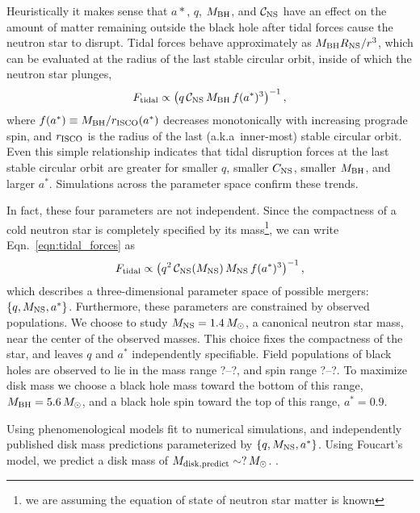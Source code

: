 Heuristically it makes sense that $a*$, $q$, $M_{\rm BH}$, and
$\mathcal{C}_{\rm NS}$ have an effect on the amount of matter remaining outside
the black hole after tidal forces cause the neutron star to disrupt.
Tidal forces behave approximately as $M_{\rm BH} R_{\rm NS}/r^3$,
which can be evaluated at the radius of the last stable circular orbit,
inside of which the neutron star plunges, 
\begin{equation}
  \label{eqn:tidal_forces}
  F_{\rm tidal} \propto
  \left(q \,\mathcal{C}_{\rm NS}\, M_{\rm BH} \,f(a^*)^3\right)^{-1},
\end{equation}
where $f(a^*) \equiv M_{\rm BH}/r_{\rm ISCO}(a^*)$ decreases monotonically with increasing
prograde spin, and $r_{\rm ISCO}$ is the radius of the last (a.k.a\ inner-most)
stable circular orbit. Even this simple relationship indicates that
tidal disruption forces at the last stable circular orbit are greater for smaller
$q$, smaller $C_{\rm NS}$, smaller $M_{\rm BH}$, and larger $a^*$.
Simulations across the parameter space confirm these trends.

In fact, these four parameters are not independent. Since the compactness of a
cold neutron star is completely specified by its mass\footnote{we are
assuming the equation of state of neutron star matter is known}, we can write
Eqn.~\ref{eqn:tidal_forces} as
\begin{equation}
  F_{\rm tidal} \propto
  \left(q^2 \,\mathcal{C}_{\rm NS}(M_{\rm NS})\, M_{\rm NS}\, f(a^*)^3\right)^{-1},
\end{equation}
which describes a three-dimensional parameter space of possible mergers:
$\{q,M_{\rm NS},a^*\}$.
Furthermore, these parameters are constrained by observed populations. We
choose to study $M_{\rm NS}=1.4\,M_{\odot}$, a canonical neutron star mass, near
the center of the observed masses.
This choice fixes the compactness of the star, and leaves $q$ and $a^*$
independently specifiable.
Field populations of black holes are observed to lie in the mass range ?--?,
and spin range ?--?.
To maximize disk mass we choose a black hole mass toward the bottom of this
range, $M_{\rm BH}=5.6\,M_\odot$, and a black hole spin toward the top of this
range, $a^*=0.9$.

Using phenomenological models fit to numerical simulations,
\cite{fouc2012-disk_mass} and \cite{pann2010-disk_mass} independently published
disk mass predictions parameterized by $\{q,M_{\rm NS},a^*\}$.
Using Foucart's model, we predict a disk mass of
$M_{\rm disk,predict}\sim ?\,M_\odot$.
.

